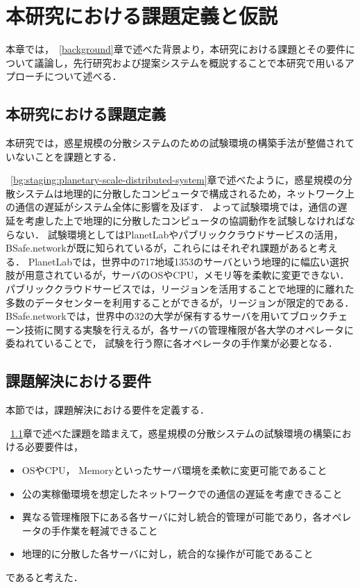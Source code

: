 \chapter{本研究における課題定義と仮説}
\label{issue}

本章では，~\ref{background}章で述べた背景より，本研究における課題とその要件について議論し，先行研究および提案システムを概説することで本研究で用いるアプローチについて述べる．

\section{本研究における課題定義}
\label{issue:definition}

本研究では，惑星規模の分散システムのための試験環境の構築手法が整備されていないことを課題とする．

~\ref{bg:staging:planetary-scale-distributed-system}章で述べたように，惑星規模の分散システムは地理的に分散したコンピュータで構成されるため，ネットワーク上の通信の遅延がシステム全体に影響を及ぼす．
よって試験環境では，通信の遅延を考慮した上で地理的に分散したコンピュータの協調動作を試験しなければならない．
試験環境としてはPlanetLabやパブリッククラウドサービスの活用，BSafe.networkが既に知られているが，これらにはそれぞれ課題があると考える．
PlanetLabでは，世界中の717地域1353のサーバという地理的に幅広い選択肢が用意されているが，サーバのOSやCPU，メモリ等を柔軟に変更できない．
パブリッククラウドサービスでは，リージョンを活用することで地理的に離れた多数のデータセンターを利用することができるが，リージョンが限定的である．
BSafe.networkでは，世界中の32の大学が保有するサーバを用いてブロックチェーン技術に関する実験を行えるが，各サーバの管理権限が各大学のオペレータに委ねれていることで，
試験を行う際に各オペレータの手作業が必要となる．

\section{課題解決における要件}
\label{issue:requirements}

本節では，課題解決における要件を定義する．

~\ref{issue:definition}章で述べた課題を踏まえて，惑星規模の分散システムの試験環境の構築における必要要件は，
\begin{itemize}
  \item OSやCPU， Memoryといったサーバ環境を柔軟に変更可能であること
  \item 公の実稼働環境を想定したネットワークでの通信の遅延を考慮できること
  \item 異なる管理権限下にある各サーバに対し統合的管理が可能であり，各オペレータの手作業を軽減できること
  \item 地理的に分散した各サーバに対し，統合的な操作が可能であること
\end{itemize}
であると考えた．

